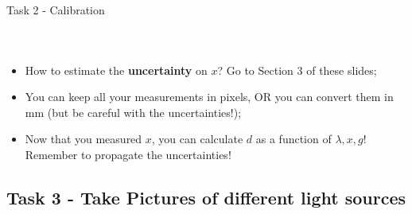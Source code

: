 \documentclass[9pt, xcolor=dvipsnames]{beamer}
\begin{document}
\begin{frame}{Task 2 - Calibration}
\begin{columns}
\begin{figure}
\begin{centering}
		\end{centering}
		\end{figure}
\end{columns}

	

	\begin{itemize}
		\item How to estimate the \textbf{uncertainty} on $x$? Go to Section 3 of these slides;
		\item You can keep all your measurements in pixels, OR you can convert them in mm (but be careful with the uncertainties!);
		\item Now that you measured $x$, you can calculate $d$ as a function of $\lambda, x, g$! Remember to propagate the uncertainties!

	\end{itemize}
	
	
\end{frame}
\subsection{ Task 3 - Take Pictures of different light sources}
\end{document}
